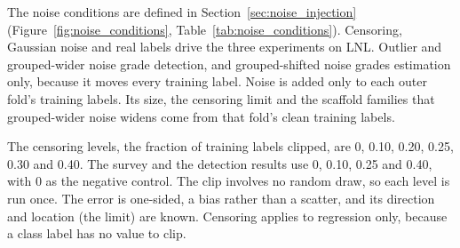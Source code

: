 
The noise conditions are defined in Section~\ref{sec:noise_injection} (Figure~\ref{fig:noise_conditions}, Table~\ref{tab:noise_conditions}). Censoring, Gaussian noise and real labels drive the three experiments on LNL. Outlier and grouped-wider noise grade detection, and grouped-shifted noise grades estimation only, because it moves every training label. Noise is added only to each outer fold's training labels. Its size, the censoring limit and the scaffold families that grouped-wider noise widens come from that fold's clean training labels.

The censoring levels, the fraction of training labels clipped, are 0, 0.10, 0.20, 0.25, 0.30 and 0.40. The survey and the detection results use 0, 0.10, 0.25 and 0.40, with 0 as the negative control. The clip involves no random draw, so each level is run once. The error is one-sided, a bias rather than a scatter, and its direction and location (the limit) are known. Censoring applies to regression only, because a class label has no value to clip.

